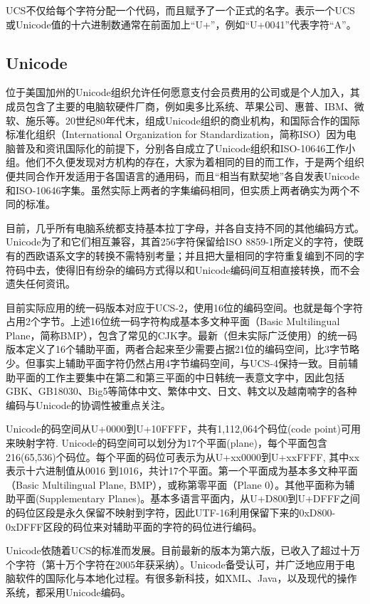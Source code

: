 UCS不仅给每个字符分配一个代码，而且赋予了一个正式的名字。表示一个UCS或Unicode值的十六进制数通常在前面加上“U+”，例如“U+0041”代表字符“A”。

\subsection{Unicode}
位于美国加州的Unicode组织允许任何愿意支付会员费用的公司或是个人加入，其成员包含了主要的电脑软硬件厂商，例如奥多比系统、苹果公司、惠普、IBM、微软、施乐等。20世纪80年代末，组成Unicode组织的商业机构，和国际合作的国际标准化组织（International Organization for Standardization，简称ISO）因为电脑普及和资讯国际化的前提下，分别各自成立了Unicode组织和ISO-10646工作小组。他们不久便发现对方机构的存在，大家为着相同的目的而工作，于是两个组织便共同合作开发适用于各国语言的通用码，而且“相当有默契地”各自发表Unicode和ISO-10646字集。虽然实际上两者的字集编码相同，但实质上两者确实为两个不同的标准。

目前，几乎所有电脑系统都支持基本拉丁字母，并各自支持不同的其他编码方式。Unicode为了和它们相互兼容，其首256字符保留给ISO 8859-1所定义的字符，使既有的西欧语系文字的转换不需特别考量；并且把大量相同的字符重复编到不同的字符码中去，使得旧有纷杂的编码方式得以和Unicode编码间互相直接转换，而不会遗失任何资讯。

目前实际应用的统一码版本对应于UCS-2，使用16位的编码空间。也就是每个字符占用2个字节。上述16位统一码字符构成基本多文种平面（Basic Multilingual Plane，简称BMP），包含了常见的CJK字。最新（但未实际广泛使用）的统一码版本定义了16个辅助平面，两者合起来至少需要占据21位的编码空间，比3字节略少。但事实上辅助平面字符仍然占用4字节编码空间，与UCS-4保持一致。目前辅助平面的工作主要集中在第二和第三平面的中日韩统一表意文字中，因此包括GBK、GB18030、Big5等简体中文、繁体中文、日文、韩文以及越南喃字的各种编码与Unicode的协调性被重点关注。

Unicode的码空间从U+0000到U+10FFFF，共有1,112,064个码位(code point)可用来映射字符. Unicode的码空间可以划分为17个平面(plane)，每个平面包含216(65,536)个码位。每个平面的码位可表示为从U+xx0000到U+xxFFFF, 其中xx表示十六进制值从0016 到1016，共计17个平面。第一个平面成为基本多文种平面（Basic Multilingual Plane, BMP），或称第零平面（Plane 0）。其他平面称为辅助平面(Supplementary Planes)。基本多语言平面内，从U+D800到U+DFFF之间的码位区段是永久保留不映射到字符，因此UTF-16利用保留下来的0xD800-0xDFFF区段的码位来对辅助平面的字符的码位进行编码。

Unicode依随着UCS的标准而发展。目前最新的版本为第六版，已收入了超过十万个字符（第十万个字符在2005年获采纳）。Unicode备受认可，并广泛地应用于电脑软件的国际化与本地化过程。有很多新科技，如XML、Java，以及现代的操作系统，都采用Unicode编码。

